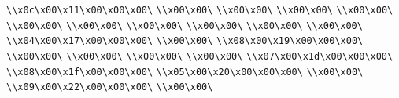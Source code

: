 \verb|\\x0c\x00\x11\x00\x00\x00\|\newline
\verb|\\x00\x00\|\newline
\verb|\\x00\x00\|\newline
\verb|\\x00\x00\|\newline
\verb|\\x00\x00\|\newline
\verb|\\x00\x00\|\newline
\verb|\\x00\x00\|\newline
\verb|\\x00\x00\|\newline
\verb|\\x00\x00\|\newline
\verb|\\x00\x00\|\newline
\verb|\\x00\x00\|\newline
\verb|\\x04\x00\x17\x00\x00\x00\|\newline
\verb|\\x00\x00\|\newline
\verb|\\x08\x00\x19\x00\x00\x00\|\newline
\verb|\\x00\x00\|\newline
\verb|\\x00\x00\|\newline
\verb|\\x00\x00\|\newline
\verb|\\x00\x00\|\newline
\verb|\\x07\x00\x1d\x00\x00\x00\|\newline
\verb|\\x08\x00\x1f\x00\x00\x00\|\newline
\verb|\\x05\x00\x20\x00\x00\x00\|\newline
\verb|\\x00\x00\|\newline
\verb|\\x09\x00\x22\x00\x00\x00\|\newline
\verb|\\x00\x00\|\newline
